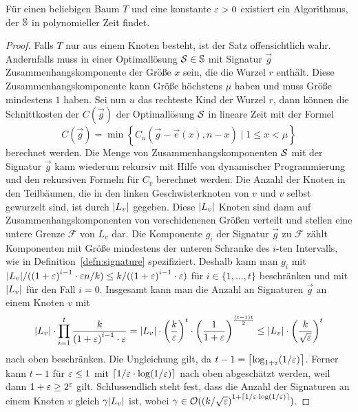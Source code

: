 \begin{thm}\label{thm:cutphase}
    Für einen beliebigen Baum $T$ und eine konstante $\eps > 0$ existiert ein Algorithmus, der $\bbS$ in polynomieller Zeit findet.
\end{thm}
\begin{proof}
    Falls $T$ nur aus einem Knoten besteht, ist der Satz offensichtlich wahr.
    Andernfalls muss in einer Optimallösung $\calS \in \bbS$ mit Signatur $\vec{g}$ Zusammenhangskomponente der Größe $x$ sein, die die Wurzel $r$ enthält.
    Diese Zusammenhangskomponente kann Größe höchstens $\mu$ haben und muss Größe mindestens $1$ haben.
    Sei nun $u$ das rechteste Kind der Wurzel $r$, dann können die Schnittkosten der $C(\vec{g})$ der Optimallösung $\calS$ in lineare Zeit mit der Formel
    \begin{equation} \label{eq:root}
        C(\vec{g}) = \min \left\{ C_u(\vec{g} - \vec{e}(x), n - x) \mid 1 \leq x < \mu \right\}
    \end{equation}
    berechnet werden.
    Die Menge von Zusammenhangskomponenten $\calS$ mit der Signatur $\vec{g}$ kann wiederum rekursiv mit Hilfe von dynamischer Programmierung und den rekursiven Formeln für $C_v$ berechnet werden.
    Die Anzahl der Knoten in den Teilbäumen, die in den linken Geschwisterknoten von $v$ und $v$ selbst gewurzelt sind, ist durch $\card{L_v}$ gegeben.
    Diese $\card{L_v}$ Knoten sind dann auf Zusammenhangskomponenten von verschidenenen Größen verteilt und stellen eine untere Grenze $\mathcal{F}$ von $L_v$ dar.
    Die Komponente $g_i$ der Signatur $\vec{g}$ zu $\mathcal{F}$ zählt Komponenten mit Größe mindestens der unteren Schranke des $i$-ten Intervalls, wie in Definition~\ref{defn:signature} spezifiziert.
    Deshalb kann man $g_i$ mit $\card{L_v}/({(1 + \eps)}^{i - 1} \cdot \eps n/k) \leq k/({(1 + \eps)}^{i - 1} \cdot \eps)$ für $i \in \{1, \ldots, t\}$ beschränken und mit $\card{L_v}$ für den Fall $i = 0$.
    Insgesamt kann man die Anzahl an Signaturen $\vec{g}$ an einem Knoten $v$ mit
    \begin{equation*}
        \card{L_v} \cdot \prod^t_{i=1} \frac{k}{{(1 + \eps)}^{i - 1} \cdot \eps} 
        = \card{L_v} \cdot {\left( \frac{k}{\eps} \right)}^t \cdot {\left( \frac{1}{1 + \eps} \right)}^{\frac{(t-1)t}{2}} 
        \leq \card{L_v} \cdot {\left( \frac{k}{\sqrt{\eps}} \right)}^t
    \end{equation*}
    nach oben beschränken. 
    Die Ungleichung gilt, da $t - 1 = \ceil*{\log_{1 + \eps}(1/\eps)}$. 
    Ferner kann $t - 1$ für $\eps \leq 1$ mit $\ceil*{1/\eps \cdot \log(1/\eps)}$ nach oben abgeschätzt werden, weil dann $1 + \eps \geq 2^\eps$ gilt.
    Schlussendlich steht fest, dass die Anzahl der Signaturen an einem Knoten $v$ gleich $\gamma \card{L_v}$ ist, wobei $\gamma \in \bigO({(k/\sqrt{\eps})}^{1 + \ceil{1/\eps \cdot \log(1/\eps)}})$.


\end{proof}
